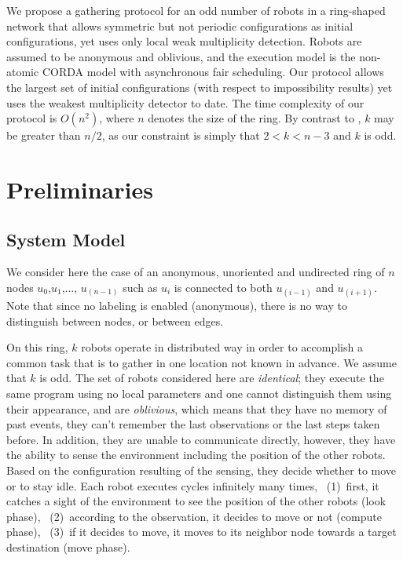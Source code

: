 \documentclass[11pt]{article}
\begin{document}
We propose a gathering protocol for an odd number of robots in a ring-shaped network that allows symmetric but not periodic configurations as initial configurations, yet uses only local weak multiplicity detection. Robots are assumed to be anonymous and oblivious, and the execution model is the non-atomic CORDA model with asynchronous fair scheduling. Our protocol allows the largest set of initial configurations (with respect to impossibility results) yet uses the weakest multiplicity detector to date. The time complexity of our protocol is $O(n^2)$, where $n$ denotes the size of the ring. By contrast to \cite{Izumi10}, $k$ may be greater than $n/2$, as our constraint is simply that $2<k<n-3$ and $k$ is odd.

\section{Preliminaries}

\subsection{System Model}\label{sec:Model}
We consider here the case of an anonymous, unoriented and undirected ring of $n$ nodes $u_{0}$,$u_{1}$,..., $u_{(n-1)}$ such as $u_{i}$ is connected to both $u_{(i-1)}$ and $u_{(i+1)}$. 
Note that since no labeling is enabled (anonymous), there is no way to distinguish between nodes, or between edges. 

On this ring, $k$ robots operate in distributed way in order to accomplish a common task that is to gather in one location not known in advance. 
We assume that $k$ is odd.
The set of robots considered here are \textit{identical}; they execute the same program using no local parameters and one cannot distinguish them using their appearance, and are \textit{oblivious}, which means that they have no memory of past events, they can't remember the last observations or the last steps taken before. 
In addition, they are unable to communicate directly, however, they have the ability to sense the environment including the position of the other robots. 
Based on the configuration resulting of the sensing, they decide whether to move or to stay idle. 
Each robot executes cycles infinitely many times, 
~(1)~first, it catches a sight of the environment to see the position of the other robots (look phase), 
~(2)~according to the observation, it decides to move or not (compute phase), 
~(3)~if it decides to move, it moves to its neighbor node towards a target destination (move phase). 
\end{document}
